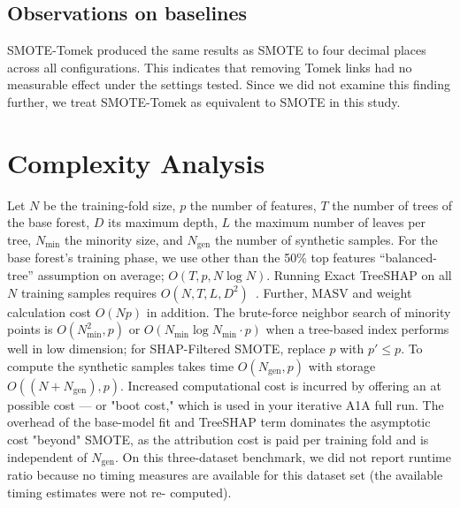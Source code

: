 \documentclass[conference]{IEEEtran}
\begin{document}
\subsection{Observations on baselines}
SMOTE-Tomek produced the same results as SMOTE to four decimal places across all configurations. This indicates that removing Tomek links had no measurable effect under the settings tested. Since we did not examine this finding further, we treat SMOTE-Tomek as equivalent to SMOTE in this study.

\section{Complexity Analysis}
Let $N$ be the training-fold size, $p$ the number of features, $T$ the number of trees of the base forest, $D$ its maximum depth, $L$ the maximum number of leaves per tree, $N_{\text{min}}$ the minority size, and $N_{\text{gen}}$ the number of synthetic samples. For the base forest's training phase, we use other than the 50\% top features “balanced-tree” assumption on average; $O(T,p,N\log N)$. Running Exact TreeSHAP on all $N$ training samples requires $O(N,T,L,D^2)$~\cite{b6}. Further, MASV and weight calculation cost $O(Np)$ in addition. The brute-force neighbor search of minority points is $O(N_{\text{min}}^2,p)$ or $O(N_{\text{min}}\log N_{\text{min}}\cdot p)$ when a tree-based index performs well in low dimension; for SHAP-Filtered SMOTE, replace $p$ with $p'\le p $. To compute the synthetic samples takes time $O(N_{\text{gen}},p)$ with storage $O((N+N_{\text{gen}}),p)$. Increased computational cost is incurred by offering an at possible cost — or "boot cost," which is used in your iterative A1A full run. The overhead of the base-model fit and TreeSHAP term dominates the asymptotic cost "beyond" SMOTE, as the attribution cost is paid per training fold and is independent of $N_{\text{gen}}$. On this three-dataset benchmark, we did not report runtime ratio because no timing measures are available for this dataset set (the available timing estimates were not re- computed).
\end{document}
